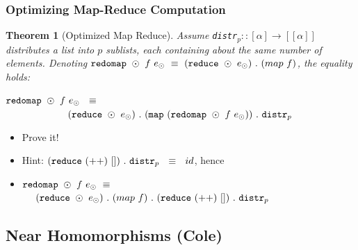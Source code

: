 \documentclass{beamer}
\renewcommand{\emph}[1]{\textcolor{structure}{#1}}
\newcommand{\emp}[1]{\textcolor{DikuRed}{ #1}}
\newtheorem{mytheo}{Theorem}
\begin{document}
\begin{frame}[fragile,t]
  \frametitle{Optimizing Map-Reduce Computation}

\begin{mytheo}[Optimized Map Reduce]\label{MapRed}
Assume {\tt distr$_p :: [\alpha] \rightarrow [[\alpha]]$}
distributes a list into $p$ sublists, each containing about 
the same number of elements. Denoting  
${\tt redomap }\ \odot \ f \ e_{\odot} \ \equiv \ ({\tt reduce} \ \odot \ e_{\odot}) \ . \ (map \ f)$, the equality holds:\\\bigskip

\emp{${\tt redomap} \ \odot \ f \ e_{\odot} \ \ \equiv$}\\
\emp{$\ \ \ \ \ \ \ \ \ \ \ \ \ \ \ \ \ \ \ ({\tt reduce} \ \odot \ e_{\odot}) \ . \ ({\tt map} \ ({\tt redomap} \ \odot \ f \ e_{\odot})) \ . \ {\tt distr}_p$}
\end{mytheo}

\begin{itemize}
    \item \alert{Prove it!}
    \item \emph{Hint: $({\tt reduce} \ (++) \ []) \ . \ {\tt distr}_p \ \ \equiv \ \ id$, hence}
    \item \emph{${\tt redomap }\ \odot \ f \ e_{\odot} \ \equiv$\\ $\ \ \ \ ({\tt reduce} \ \odot \ e_{\odot}) \ . \ (map \ f) \ . \ ({\tt reduce} \ (++) \ []) \ . \ {\tt distr}_p$}
\end  {itemize}

\end{frame}


\subsection{Near Homomorphisms (Cole)}

\begin{frame}[fragile]
	\tableofcontents[currentsubsection]
\end{frame}
\end{document}
